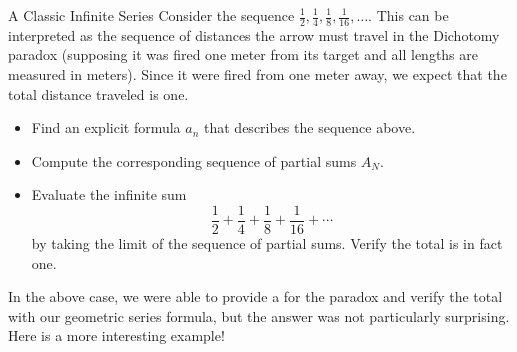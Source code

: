 \begin{exercise}{A Classic Infinite Series \Coffeecup \Coffeecup}
Consider the sequence $\frac{1}{2},\frac{1}{4},\frac{1}{8},\frac{1}{16},\ldots$.  This can be interpreted as the sequence of distances the arrow must travel in the Dichotomy paradox (supposing it was fired one meter from its target and all lengths are measured in meters).  Since it were fired from one meter away, we expect that the total distance traveled is one.

\begin{itemize}
\item Find an explicit formula $a_n$ that describes the sequence above.
\item Compute the corresponding sequence of partial sums $A_N$. 
\item Evaluate the infinite sum $$\frac{1}{2}+\frac{1}{4}+\frac{1}{8}+\frac{1}{16}+\cdots $$
by taking the limit of the sequence of partial sums.  Verify the total is in fact one.
\end{itemize}

\end{exercise}

In the above case, we were able to provide a  for the paradox and verify the total with our geometric series formula, but the answer was not particularly surprising.  Here is a more interesting example! 

